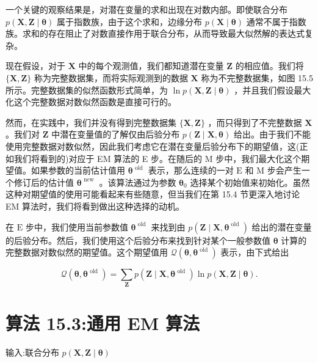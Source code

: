 \documentclass[10pt]{article}
\begin{document}
一个关键的观察结果是，对潜在变量的求和出现在对数内部。即使联合分布 \(p\left( {\mathbf{X},\mathbf{Z} \mid  \mathbf{\theta }}\right)\) 属于指数族，由于这个求和，边缘分布 \(p\left( {\mathbf{X} \mid  \mathbf{\theta }}\right)\) 通常不属于指数族。求和的存在阻止了对数直接作用于联合分布，从而导致最大似然解的表达式复杂。

现在假设，对于 \(\mathbf{X}\) 中的每个观测值，我们都知道潜在变量 \(\mathbf{Z}\) 的相应值。我们将 \(\{ \mathbf{X},\mathbf{Z}\}\) 称为完整数据集，而将实际观测到的数据 \(\mathbf{X}\) 称为不完整数据集，如图 15.5 所示。完整数据集的似然函数形式简单，为 \(\ln p\left( {\mathbf{X},\mathbf{Z} \mid  \mathbf{\theta }}\right)\) ，并且我们假设最大化这个完整数据对数似然函数是直接可行的。

然而，在实践中，我们并没有得到完整数据集 \(\{ \mathbf{X},\mathbf{Z}\}\) ，而只得到了不完整数据 \(\mathbf{X}\) 。我们对 \(\mathbf{Z}\) 中潜在变量值的了解仅由后验分布 \(p\left( {\mathbf{Z} \mid  \mathbf{X},\mathbf{\theta }}\right)\) 给出。由于我们不能使用完整数据对数似然，因此我们考虑它在潜在变量后验分布下的期望值，这(正如我们将看到的)对应于 EM 算法的 E 步。在随后的 M 步中，我们最大化这个期望值。如果参数的当前估计值用 \({\mathbf{\theta }}^{\text{ old }}\) 表示，那么连续的一对 \(\mathrm{E}\) 和 \(\mathrm{M}\) 步会产生一个修订后的估计值 \({\mathbf{\theta }}^{\text{ new }}\) 。该算法通过为参数 \({\mathbf{\theta }}_{0}\) 选择某个初始值来初始化。虽然这种对期望值的使用可能看起来有些随意，但当我们在第 15.4 节更深入地讨论 EM 算法时，我们将看到做出这种选择的动机。

在 \(\mathrm{E}\) 步中，我们使用当前参数值 \({\mathbf{\theta }}^{\text{ old }}\) 来找到由 \(p\left( {\mathbf{Z} \mid  \mathbf{X},{\mathbf{\theta }}^{\text{ old }}}\right)\) 给出的潜在变量的后验分布。然后，我们使用这个后验分布来找到针对某个一般参数值 \(\mathbf{\theta }\) 计算的完整数据对数似然的期望值。这个期望值用 \(\mathcal{Q}\left( {\mathbf{\theta },{\mathbf{\theta }}^{\text{ old }}}\right)\) 表示，由下式给出

\[
\mathcal{Q}\left( {\mathbf{\theta },{\mathbf{\theta }}^{\text{ old }}}\right)  = \mathop{\sum }\limits_{\mathbf{Z}}p\left( {\mathbf{Z} \mid  \mathbf{X},{\mathbf{\theta }}^{\text{ old }}}\right) \ln p\left( {\mathbf{X},\mathbf{Z} \mid  \mathbf{\theta }}\right) . \tag{15.23}
\]

\section*{算法 15.3:通用 EM 算法}

输入:联合分布 \(p\left( {\mathbf{X},\mathbf{Z} \mid  \mathbf{\theta }}\right)\)
\end{document}
